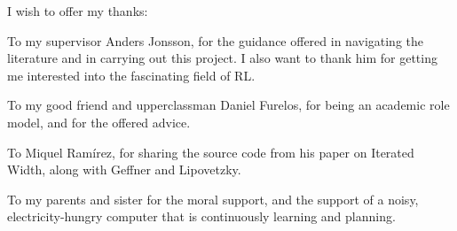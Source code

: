 \newpage
\thispagestyle{empty}
\vfill
{}

I wish to offer my thanks:

To my supervisor Anders Jonsson, for the guidance offered in navigating the
literature and in carrying out this project. I also want to thank him for
getting me interested into the fascinating field of \acs{RL}.

To my good friend and upperclassman Daniel Furelos, for being an academic role
model, and for the offered advice.

To Miquel Ramírez, for sharing the source code from his paper on Iterated Width,
along with Geffner and Lipovetzky.

To my parents and sister for the moral support, and the support of a noisy,
electricity-hungry computer that is continuously learning and planning.

\vfill